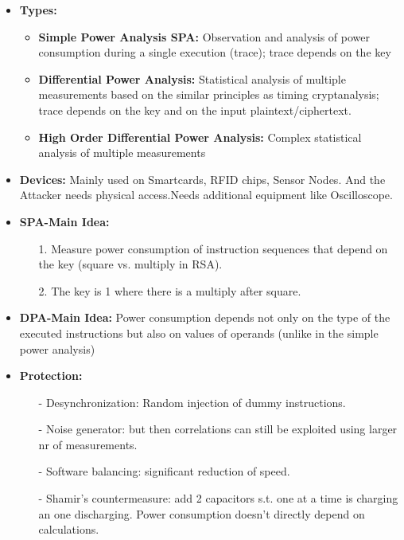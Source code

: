 \begin{itemize}
    \item\textbf{Types: }
    \begin{itemize}
        \item\textbf{Simple Power Analysis SPA: }Observation and analysis of power consumption during a
        single execution (trace); trace depends on the key 
        \item\textbf{Differential Power Analysis: }Statistical analysis of multiple measurements based on the
        similar principles as timing cryptanalysis; trace depends on the key and on the input plaintext/ciphertext.
        \item\textbf{High Order Differential Power Analysis: }Complex statistical analysis of multiple measurements
    \end{itemize}{}
    \item\textbf{Devices: }Mainly used on Smartcards, RFID chips, Sensor Nodes. And the Attacker needs physical access.Needs additional equipment like Oscilloscope.
    \item\textbf{SPA-Main Idea: }
    \begin{itemize}
        \item[1.]Measure power consumption of instruction sequences that depend on the key (square vs. multiply in RSA).
        \item[2.]The key is 1 where there is a multiply after square.
    \end{itemize}{}
    \item\textbf{DPA-Main Idea: }Power consumption depends not only on the type of the executed instructions but also on values of operands (unlike in the simple power analysis)
    \item\textbf{Protection: }
    \begin{itemize}
        \item[-]Desynchronization: Random injection of dummy instructions.
        \item[-]Noise generator: but then correlations can still be exploited using larger nr of measurements.
        \item[-]Software balancing: significant reduction of speed.
        \item[-]Shamir's countermeasure: add 2 capacitors s.t. one at a time is charging an one discharging. Power consumption doesn't directly depend on calculations. 
    \end{itemize}{}
\end{itemize}{}

